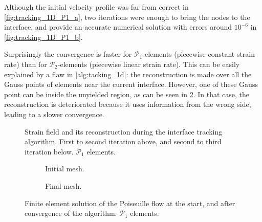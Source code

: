 \documentclass[11 pt]{report}
\begin{document}
\FloatBarrier
Although the initial velocity profile was far from correct in \cref{fig:tracking_1D_P1_a}, two iterations were enough to bring the nodes to the interface, and provide an accurate numerical solution with errors around $10^{-6}$ in \cref{fig:tracking_1D_P1_b}.

Surprisingly the convergence is faster for $\mathcal{P}_1$-elements (piecewise constant strain rate) than for $\mathcal{P}_2$-elements (piecewise linear strain rate). This can be easily explained by a flaw in \cref{alg:tacking_1d}: the reconstruction is made over all the Gauss points of elements near the current interface. However, one of these Gauss point can be inside the unyielded region, as can be seen in \cref{fig:tracking_1D_P2_steps}. In that case, the reconstruction is deteriorated because it uses information from the wrong side, leading to a slower convergence.

\begin{figure}[hb]
    \centering
    \begin{subfigure}[t]{\textwidth}
        
        \label{subfig:tracking_1D_P2_step_1}
    \end{subfigure}
    \begin{subfigure}[t]{\textwidth}
        
    \end{subfigure}
    \caption{Strain field and its reconstruction during the interface tracking algorithm. First to second iteration above, and second to third iteration below. $\mathcal{P}_1$ elements.}
    \label{fig:tracking_1D_P2_steps}
\end{figure}

\begin{figure}[ht]
    \centering
    \begin{subfigure}[t]{\textwidth}
        
        \caption{Initial mesh.}
    \end{subfigure}
    \begin{subfigure}[t]{\textwidth}
        
        \caption{Final mesh.}
    \end{subfigure}
    \caption{Finite element solution of the Poiseuille flow at the start, and after convergence of the algorithm. $\mathcal{P}_1$ elements.}
    \label{fig:tracking_1D_P2}
\end{figure}
\end{document}
